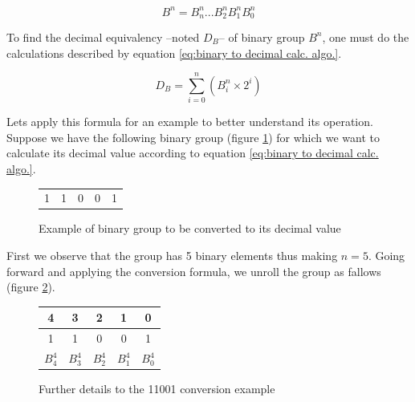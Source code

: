 \documentclass[12pt, a4paper]{book}
\begin{document}
\begin{equation}
  B^n=B^n_n...B^n_2B^n_1B^n_0
  \label{eq:general binary concatenation}
\end{equation} 

To find the decimal equivalency --noted $D_B$-- of binary group $B^n$, one must do the calculations described by equation \ref{eq:binary to decimal calc. algo.}.

\begin{equation}
  D_B=\sum^n_{i=0}(B^n_i \times 2^i)
  \label{eq:binary to decimal calc. algo.}
\end{equation}

Lets apply this formula for an example to better understand its operation. Suppose we have the following binary group (figure \ref{fig:binary to decimal 11001 example}) for which we want to calculate its decimal value according to equation \ref{eq:binary to decimal calc. algo.}.

\begin{figure}[h]
  \centering
  \renewcommand{\arraystretch}{1.5}
  \begin{tabular}{c c c c c}
    {\Large 1} & {\Large 1} & {\Large 0} & {\Large 0} & {\Large 1} \\
  \end{tabular}
  \renewcommand{\arraystretch}{1.0}
  \caption{Example of binary group to be converted to its decimal value}
  \label{fig:binary to decimal 11001 example}
\end{figure}

First we observe that the group has 5 binary elements thus making $n=5$. Going forward and applying the conversion formula, we unroll the group as fallows (figure \ref{fig:binary to decimal 11001 example adnoted}). 

\begin{figure}[h]
  \centering
  \renewcommand{\arraystretch}{1.5}
  \begin{tabular}{c c c c c}
    {\small 4} & {\small 3} & {\small 2} & {\small 1} & {\small 0} \\ \hline
    
    {\cellcolor{blue!05}\Large 1} & 
    {\cellcolor{blue!05}\Large 1} & 
    {\cellcolor{blue!05}\Large 0} & 
    {\cellcolor{blue!05}\Large 0} & 
    {\cellcolor{blue!05}\Large 1} \\ \hline
    
    $B^4_4$ & $B^4_3$ & $B^4_2$ & $B^4_1$ & $B^4_0$ \\
  \end{tabular}
  \renewcommand{\arraystretch}{1.0}
  \caption{Further details to the 11001 conversion example}
  \label{fig:binary to decimal 11001 example adnoted}
\end{figure}
\end{document}
